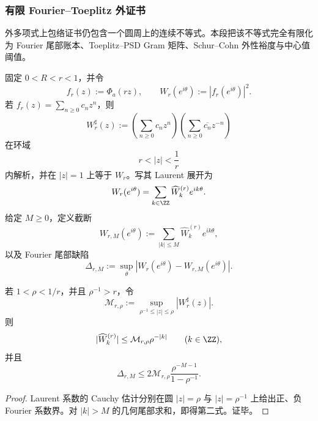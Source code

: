 \subsubsection{有限 Fourier--Toeplitz 外证书}\label{subsubsec:typed-address-biaxial-completion-finite-fourier-toeplitz-outer-certificate}
外多项式上包络证书仍包含一个圆周上的连续不等式。本段把该不等式完全有限化为 Fourier 尾部账本、Toeplitz--PSD Gram 矩阵、Schur--Cohn 外性裕度与中心值阈值。

固定 \(0<R<r<1\)，并令
\[
f_r(z):=\Phi_a(rz),
\qquad
W_r(e^{i\theta}):=|f_r(e^{i\theta})|^2.
\]
若 \(f_r(z)=\sum_{n\ge0}c_nz^n\)，则
\[
W_r^\sharp(z):=
\left(\sum_{n\ge0}c_nz^n\right)
\left(\sum_{n\ge0}\overline{c_n}z^{-n}\right)
\]
在环域
\[
r<|z|<\frac1r
\]
内解析，并在 \(|z|=1\) 上等于 \(W_r\)。写其 Laurent 展开为
\[
W_r(e^{i\theta})
=
\sum_{k\in\ZZ}\widehat W_k^{(r)}e^{ik\theta}.
\]
给定 \(M\ge0\)，定义截断
\[
W_{r,M}(e^{i\theta})
:=
\sum_{|k|\le M}\widehat W_k^{(r)}e^{ik\theta},
\]
以及 Fourier 尾部缺陷
\[
\Delta_{r,M}
:=
\sup_{\theta}
\left|W_r(e^{i\theta})-W_{r,M}(e^{i\theta})\right|.
\]

\begin{lemma}\label{lem:typed-address-biaxial-completion-fourier-tail-gap-bound}
若 \(1<\rho<1/r\)，并且 \(\rho^{-1}>r\)，令
\[
\mathcal M_{r,\rho}:=
\sup_{\rho^{-1}\le |z|\le\rho}|W_r^\sharp(z)|.
\]
则
\[
|\widehat W_k^{(r)}|\le \mathcal M_{r,\rho}\rho^{-|k|}
\qquad(k\in\ZZ),
\]
并且
\[
\Delta_{r,M}
\le
2\mathcal M_{r,\rho}
\frac{\rho^{-M-1}}{1-\rho^{-1}}.
\]
\end{lemma}
\begin{proof}
Laurent 系数的 Cauchy 估计分别在圆 \(|z|=\rho\) 与 \(|z|=\rho^{-1}\) 上给出正、负 Fourier 系数界。对 \(|k|>M\) 的几何尾部求和，即得第二式。证毕。
\end{proof}

